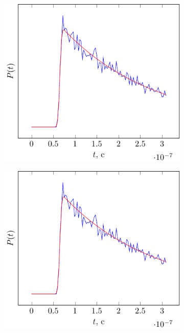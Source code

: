 \begin{figure}[ht]
    \centering
    \begin{subfigure}{0.49\linewidth}
        \centering
        \includegraphics[width=\linewidth,page=1]{fig/retracking/model}
    \end{subfigure}
    \begin{subfigure}{0.49\linewidth}
        \centering
        \includegraphics[width=\linewidth,page=3]{fig/retracking/model}

\end{subfigure}
\end{figure}
